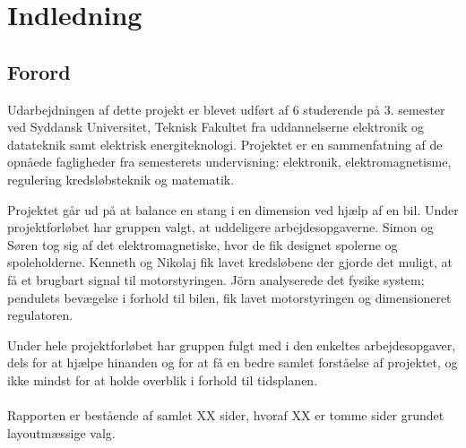 \chapter{Indledning}

\section{Forord}\label{sec:forord}
Udarbejdningen af dette projekt er blevet udført af 6 studerende på 3. semester ved Syddansk Universitet, Teknisk Fakultet fra uddannelserne elektronik og datateknik samt elektrisk energiteknologi.
Projektet er en sammenfatning af de opnåede fagligheder fra semesterets undervisning: elektronik, elektromagnetisme, regulering kredsløbsteknik og matematik.

Projektet går ud på at balance en stang i en dimension ved hjælp af en bil. Under projektforløbet har gruppen valgt, at uddeligere arbejdesopgaverne. Simon og Søren tog sig af det elektromagnetiske, hvor de fik designet spolerne og spoleholderne. Kenneth og Nikolaj fik lavet kredsløbene der gjorde det muligt, at få et brugbart signal til motorstyringen. Jörn analyserede det fysike system; pendulets bevægelse i forhold til bilen, fik lavet motorstyringen og dimensioneret regulatoren.

Under hele projektforløbet har gruppen fulgt med i den enkeltes arbejdesopgaver, dels for at hjælpe hinanden og for at få en bedre samlet forståelse af projektet, og ikke mindst for at holde overblik i forhold til tidsplanen. 
\\ \\
Rapporten er bestående af samlet XX sider, hvoraf XX er tomme sider grundet layoutmæssige valg. 